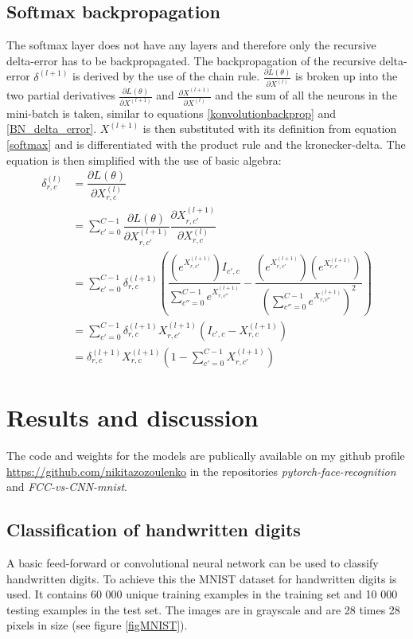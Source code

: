 \documentclass[a4paper, twoside]{article}
\newcommand*{\pd}[2]{\ensuremath{\dfrac{\partial #1}{\partial #2}}}
\newcommand*{\inpd}[2]{\ensuremath{\frac{\partial #1}{\partial #2}}}
\begin{document}
\subsection{Softmax backpropagation}
The softmax layer does not have any layers and therefore only the recursive delta-error has to be backpropagated. The backpropagation of the recursive delta-error $\delta^{(l+1)}$ is derived by the use of the chain rule. $\inpd{L(\theta)}{X^{(l)}}$ is broken up into the two partial derivatives $\inpd{L(\theta)}{X^{(l+1)}}$ and $\inpd{X^{(l+1)}}{X^{(l)}}$ and the sum of all the neurons in the mini-batch is taken, similar to equations \eqref{konvolutionbackprop} and \eqref{BN_delta_error}. $X^{(l+1)}$ is then substituted with its definition from equation \eqref{softmax} and is differentiated with the product rule and the kronecker-delta. The equation is then simplified with the use of basic algebra: \cite{cs231n} \cite{notesonbackprop} \cite{websoftmax} 
\begin{equation}
\begin{split}
\delta^{(l)}_{r,c}
		& = \pd{L(\theta)}{X^{(l)}_{r,c}} \\
		& = \sum^{C-1}_{c'=0} \pd{L(\theta)}{X^{(l+1)}_{r,c'}} \pd{X^{(l+1)}_{r,c'}}{X^{(l)}_{r,c}} \\
		& = \sum^{C-1}_{c'=0} \delta^{(l+1)}_{r,c} \left(  \dfrac{(e^{X^{(l+1)}_{r,c'}})I_{c',c}}{\sum^{C-1}_{c''=0}e^{X^{(l+1)}_{r,c''}}} - \dfrac{(e^{X^{(l+1)}_{r,c'}})(e^{X^{(l+1)}_{r,c}})}{(\sum^{C-1}_{c''=0}e^{X^{(l+1)}_{r,c''}})^2} \right) \\
		& = \sum^{C-1}_{c'=0}  \delta^{(l+1)}_{r,c} X^{(l+1)}_{r,c'}(I_{c',c}-X^{(l+1)}_{r,c}) \\
		& = \delta^{(l+1)}_{r,c} X^{(l+1)}_{r,c} \left( 1-\sum^{C-1}_{c'=0} X^{(l+1)}_{r,c'} \right)
\end{split}
\end{equation}

\section{Results and discussion}
The code and weights for the models are publically available on my github profile \url{https://github.com/nikitazozoulenko} in the repositories \textit{pytorch-face-recognition} and \textit{FCC-vs-CNN-mnist}.

\subsection{Classification of handwritten digits}
A basic feed-forward or convolutional neural network can be used to classify handwritten digits. To achieve this the MNIST dataset for handwritten digits is used. It contains 60 000 unique training examples in the training set and 10 000 testing examples in the test set. The images are in grayscale and are 28 times 28 pixels in size (see figure \ref{figMNIST}). \cite{MNIST}
\end{document}
